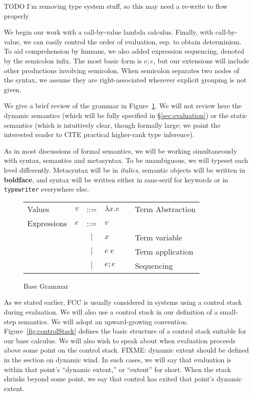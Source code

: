 \documentclass[11pt]{article}
\begin{document}
TODO I'm removing type system stuff, so this may need a re-write to flow properly

We begin our work with a call-by-value lambda calculus.
Finally, with call-by-value, we can easily control the order of evaluation, esp. to obtain determinism.
To aid comprehension by humans, we also added expression sequencing, denoted by the semicolon infix.
The most basic form is $e; e$, but our extensions will include other productions involving semicolon.
When semicolon separates two nodes of the syntax, we assume they are right-associated wherever explicit grouping is not given.

We give a brief review of the grammar in Figure~\ref{fig:startGrammar}.
We will not review here the dynamic semantics (which will be fully specified in \S\ref{sec:evaluation}) or the static semantics (which is intuitively clear, though formally large; we point the interested reader to CITE practical higher-rank type inference).

As in most discussions of formal semantics, we will be working simultaneously with syntax, semantics and metasyntax. To be unambiguous, we will typeset each level differently. Metasyntax will be in \textit{italics}, semantic objects will be written in \textbf{boldface}, and syntax will be written either in \textsf{sans-serif} for keywords or in \texttt{typewriter} everywhere else.

\begin{figure}[h]
\caption{Base Grammar}
\label{fig:startGrammar}

\begin{tabular}{llclll}
Values & $v$ & ::= & $\lambda x.e$ && Term Abstraction\\
Expressions & $e$ & ::= & $v$ && \\
& & $|$ & $x$ && Term variable \\
& & $|$ & $e\;e$ && Term application \\
& & $|$ & $e;e$ && Sequencing \\
\end{tabular}
\end{figure}

As we stated earlier, FCC is usually considered in systems using a control stack during evaluation.
We will also use a control stack in our definition of a small-step semantics.
We will adopt an upward-growing convention.
Figure~\ref{fig:controlStack} defines the basic structure of a control stack suitable for our base calculus.
We will also wish to speak about when evaluation proceeds above some point on the control stack.
FIXME: dynamic extent should be defined in the section on dynamic wind.
In such cases, we will say that evaluation is within that point's ``dynamic extent,'' or ``extent'' for short.
When the stack shrinks beyond some point, we say that control has exited that point's dynamic extent.
\end{document}
